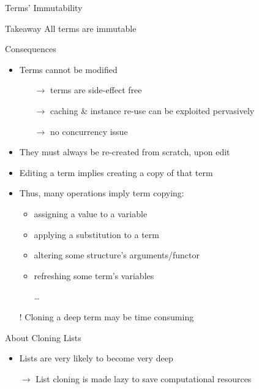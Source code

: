 \documentclass[handout]{beamer}
\begin{document}
\begin{frame}[allowframebreaks]{Terms' Immutability}

    \begin{alertblock}{Takeaway}\centering
        All terms are \alert{immutable}
    \end{alertblock}

    \begin{block}{Consequences}
        \begin{itemize}
            \item Terms cannot be modified
            \begin{itemize}
                \item[$\rightarrow$] terms are \alert{side-effect free}
                \item[$\rightarrow$] caching \& instance re-use can be exploited pervasively
                \item[$\rightarrow$] no concurrency issue
            \end{itemize}
            \item They must always be re-created from scratch, upon edit
            \item Editing a term implies creating a copy of that term
            \item Thus, many operations imply term copying:
            \begin{itemize}
                \item assigning a value to a variable
                \item applying a substitution to a term
                \item altering some structure's arguments/functor
                \item refreshing some term's variables
                \item[\ldots]
            \end{itemize}

            \smallskip

            \item[!] Cloning a \alert{deep} term may be time consuming
        \end{itemize}
    \end{block}

    \begin{exampleblock}{About Cloning Lists}
        \begin{itemize}
            \item Lists are very likely to become very deep
            \item[$\rightarrow$] List cloning is made lazy to save computational resources
        \end{itemize}
    \end{exampleblock}
\end{frame}
\end{document}
